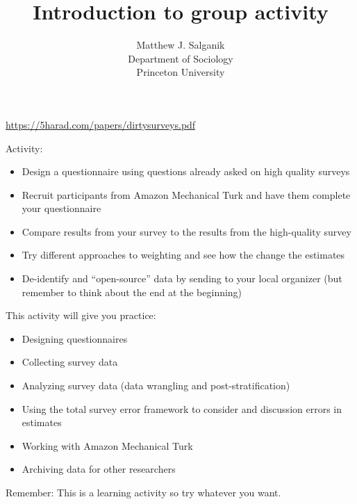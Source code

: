 \documentclass[aspectratio=169]{beamer}
\title[]{Introduction to group activity}
\author[]{Matthew J. Salganik\\Department of Sociology\\Princeton University}
\date[]{Summer Institutes in Computational Social Science\\June 20, 2019
\vfill
\begin{flushleft}
{\scriptsize
The Summer Institutes in Computational Social Science is supported by grants from the Russell Sage Foundation and the Alfred P. Sloan Foundation.}
\end{flushleft}
\begin{flushright}
\texttt{[image: figures/cc-by.png]}
\end{flushright}
}
\begin{document}
\frame{\titlepage}
\begin{frame}

\begin{center}
\end{center}

\vfill
\url{https://5harad.com/papers/dirtysurveys.pdf}

\end{frame}
\begin{frame}

Activity:
\begin{itemize}
\item Design a questionnaire using questions already asked on high quality surveys
\pause
\item Recruit participants from Amazon Mechanical Turk and have them complete your questionnaire  
\pause
\item Compare results from your survey to the results from the high-quality survey
\pause
\item Try different approaches to weighting and see how the change the estimates
\pause
\item De-identify and ``open-source'' data by sending to your local organizer (but remember to think about the end at the beginning)
\end{itemize}

\end{frame}
\begin{frame}

This activity will give you practice:
\begin{itemize}
\item Designing questionnaires
\pause
\item Collecting survey data
\pause
\item Analyzing survey data (data wrangling and post-stratification)
\pause
\item Using the total survey error framework to consider and discussion errors in estimates
\pause
\item Working with Amazon Mechanical Turk
\pause
\item Archiving data for other researchers
\end{itemize}

\vfill
Remember: This is a learning activity so try whatever you want.

\end{frame}
\end{document}

